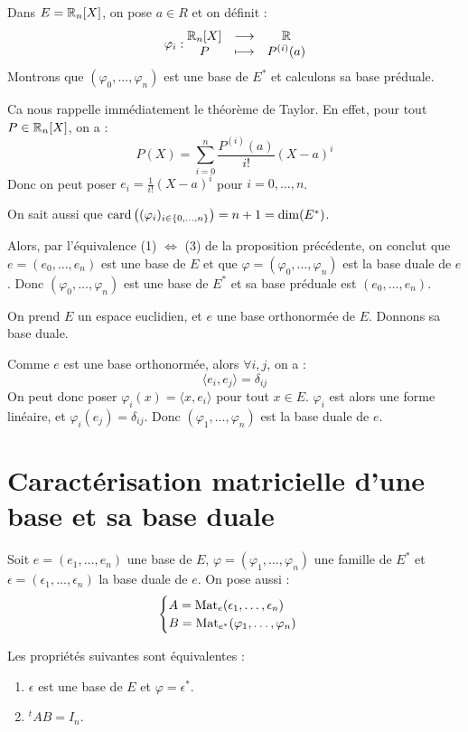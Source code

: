 \documentclass[11pt,a4paper]{report}
\begin{document}
\begin{example}
    Dans $E = \mathbb{R}_n[X]$, on pose $a \in R$ et on définit :
    $$\varphi_i : \begin{matrix} \mathbb{R}_n[X] & \longrightarrow & \mathbb{R} \\ P & \longmapsto & P^{(i)}(a) \end{matrix}$$
    Montrons que $(\varphi_0, \dots, \varphi_n)$ est une base de $E^*$ et calculons sa base préduale.

    Ca nous rappelle immédiatement le théorème de Taylor. En effet, pour tout $P \in \mathbb{R}_n[X]$, on a :
    $$P(X) = \sum_{i=0}^n \frac{P^{(i)}(a)}{i!} (X-a)^i$$
    Donc on peut poser $e_i = \frac{1}{i!} (X - a)^i$ pour $i=0,\dots,n$.
    
    On sait aussi que $\mathrm{card}\left((\varphi_i)_{i \in \{0,\dots,n\}}\right) = n+1 = \dim(E^*)$.

    Alors, par l'équivalence (1) $\iff$ (3) de la proposition précédente, on conclut que $e = (e_0, \dots, e_n)$ est une base de $E$ et que $\varphi = (\varphi_0, \dots, \varphi_n)$ est la base duale de $e$. Donc $(\varphi_0, \dots, \varphi_n)$ est une base de $E^*$ et sa base préduale est $(e_0, \dots, e_n)$.
\end{example}

\begin{example}
    On prend $E$ un espace euclidien, et $e$ une base orthonormée de $E$. Donnons sa base duale.

    Comme $e$ est une base orthonormée, alors $\forall i,j$, on a :
    $$\langle e_i, e_j \rangle = \delta_{ij}$$
    On peut donc poser $\varphi_i(x) = \langle x, e_i \rangle$ pour tout $x \in E$. $\varphi_i$ est alors une forme linéaire, et $\varphi_i(e_j) = \delta_{ij}$. Donc $(\varphi_1, \dots, \varphi_n)$ est la base duale de $e$.
\end{example}

\section{Caractérisation matricielle d'une base et sa base duale}

\begin{proposition}
    Soit $e = (e_1, \dots, e_n)$ une base de $E$, $\varphi = (\varphi_1, \dots, \varphi_n)$ une famille de $E^*$ et $\epsilon = (\epsilon_1, \dots, \epsilon_n)$ la base duale de $e$. On pose aussi :
    $$\begin{cases}
    A = \mathrm{Mat}_e(\epsilon_1, \dots, \epsilon_n) \\
    B = \mathrm{Mat}_{e^*}(\varphi_1, \dots, \varphi_n)
    \end{cases}$$

    Les propriétés suivantes sont équivalentes :
    \begin{enumerate}
        \item $\epsilon$ est une base de $E$ et $\varphi = \epsilon^*$.
        \item $^tAB = I_n$.
    \end{enumerate} 
\end{proposition}
\end{document}
